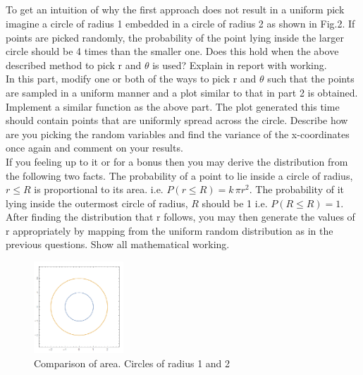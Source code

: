 \documentclass[answers]{exam}
\begin{document}
\subsection{} To get an intuition of why the first approach does not result in a uniform pick imagine a circle of radius 1 embedded in a circle of radius 2 as shown in Fig.2. If points are picked randomly, the probability of the point lying inside the larger circle should be 4 times than the smaller one. Does this hold when the above described method to pick r and $\theta$ is used? Explain in report with working.\\
In this part, modify one or both of the ways to pick r and $\theta$ such that the points are sampled in a
uniform manner and a plot similar to that in part 2 is obtained. Implement a similar function as the
above part. The plot generated this time should contain points that are uniformly spread across the
circle. Describe how are you picking the random variables and find the variance of the x-coordinates
once again and comment on your results. \\ 
If you feeling up to it or for a bonus then you may derive the distribution from the following two facts. The probability of a point to lie inside a circle of radius, $r \leq R$ is proportional to its area. i.e. $P(r \leq R) = k \, \pi r^2$. The probability of it lying inside the outermost circle of radius, $R$ should be 1 i.e. $P(R \leq R) = 1$. \\
After finding the distribution that r follows, you may then generate the values of r appropriately by mapping from the uniform random distribution as in the previous questions. Show all mathematical working. \\

\begin{figure} %
    \centering
    \includegraphics[width= 0.3\textwidth]{Q3.3_question.PNG}
    \caption{Comparison of area. Circles of radius 1 and 2}
\end{figure}
\end{document}
